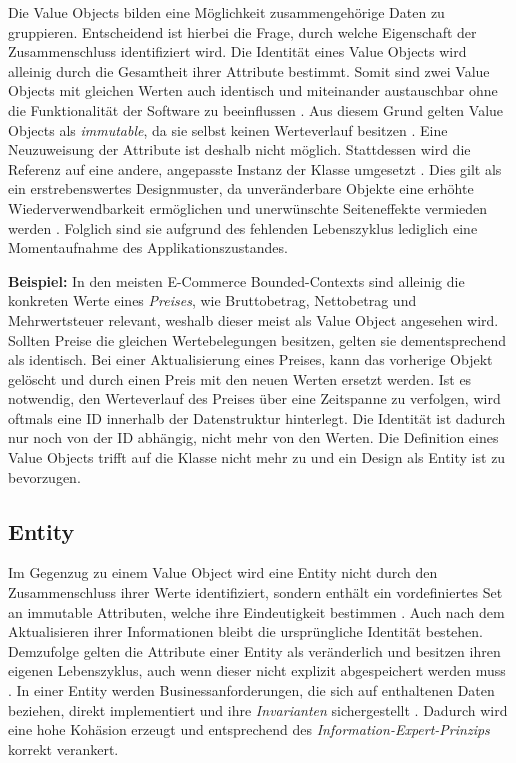 Die Value Objects bilden eine Möglichkeit zusammengehörige Daten zu gruppieren. Entscheidend ist hierbei die Frage, durch welche Eigenschaft der Zusammenschluss identifiziert wird. Die Identität eines Value Objects wird alleinig durch die Gesamtheit ihrer Attribute bestimmt. Somit sind zwei Value Objects mit gleichen Werten auch identisch und miteinander austauschbar ohne die Funktionalität der Software zu beeinflussen \cite[S. 227]{Vernon.2015}. Aus diesem Grund gelten Value Objects als \emph{\gls{immutable}}, da sie selbst keinen Werteverlauf besitzen \cite[S. 99]{Evans.2011}. Eine Neuzuweisung der Attribute ist deshalb nicht möglich. Stattdessen wird die Referenz auf eine andere, angepasste Instanz der Klasse umgesetzt \cite[S. 226]{Vernon.2015}. Dies gilt als ein erstrebenswertes Designmuster, da unveränderbare Objekte eine erhöhte Wiederverwendbarkeit ermöglichen und unerwünschte Seiteneffekte vermieden werden \cite[S. 228f.]{Vernon.2015}. Folglich sind sie aufgrund des fehlenden Lebenszyklus lediglich eine Momentaufnahme des Applikationszustandes.

\textbf{Beispiel:} In den meisten E-Commerce Bounded-Contexts sind alleinig die konkreten Werte eines \emph{Preises}, wie Bruttobetrag, Nettobetrag und Mehrwertsteuer relevant, weshalb dieser meist als Value Object angesehen wird. Sollten Preise die gleichen Wertebelegungen besitzen, gelten sie dementsprechend als identisch. Bei einer Aktualisierung eines Preises, kann das vorherige Objekt gelöscht und durch einen Preis mit den neuen Werten ersetzt werden. Ist es notwendig, den Werteverlauf des Preises über eine Zeitspanne zu verfolgen, wird oftmals eine ID innerhalb der Datenstruktur hinterlegt. Die Identität ist dadurch nur noch von der ID abhängig, nicht mehr von den Werten. Die Definition eines Value Objects trifft auf die Klasse nicht mehr zu und ein Design als Entity ist zu bevorzugen.  

\pagebreak

\subsection{Entity}

Im Gegenzug zu einem Value Object wird eine Entity nicht durch den Zusammenschluss ihrer Werte identifiziert, sondern enthält ein vordefiniertes Set an \gls{immutable} Attributen, welche ihre Eindeutigkeit bestimmen \cite[S. 94]{Evans.2011}. Auch nach dem Aktualisieren ihrer Informationen bleibt die ursprüngliche Identität bestehen. Demzufolge gelten die Attribute einer Entity als veränderlich und besitzen ihren eigenen Lebenszyklus, auch wenn dieser nicht explizit abgespeichert werden muss \cite[S. 172]{Vernon.2015}. In einer Entity werden Businessanforderungen, die sich auf enthaltenen Daten beziehen, direkt implementiert und ihre \emph{\Gls{Invariante}n} sichergestellt \cite[S. 208f.]{Vernon.2015}. Dadurch wird eine hohe Kohäsion erzeugt und entsprechend des \emph{\Gls{Information-Expert-Prinzip}s} korrekt verankert.

